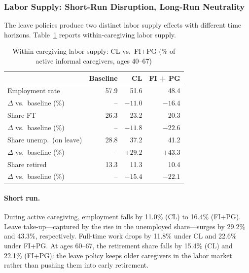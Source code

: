 \subsubsection{Labor Supply: Short-Run Disruption, Long-Run Neutrality}

The leave policies produce two distinct labor supply effects with different time horizons. Table~\ref{tab:main_labor} reports within-caregiving labor supply.

\begin{table}[htbp]
  \centering
  \caption{Within-caregiving labor supply: CL vs.\ FI+PG (\% of active informal caregivers, ages 40--67)}
  \label{tab:main_labor}
  \small
  \begin{tabular}{lrrr}
    \toprule
    & Baseline & CL & FI + PG \\
    \midrule
    Employment rate & 57.9 & 51.6 & 48.4 \\
    $\Delta$ vs.\ baseline (\%) & -- & $-11.0$ & $-16.4$ \\
    Share FT & 26.3 & 23.2 & 20.3 \\
    $\Delta$ vs.\ baseline (\%) & -- & $-11.8$ & $-22.6$ \\
    Share unemp.\ (on leave) & 28.8 & 37.2 & 41.2 \\
    $\Delta$ vs.\ baseline (\%) & -- & $+29.2$ & $+43.3$ \\
    Share retired & 13.3 & 11.3 & 10.4 \\
    $\Delta$ vs.\ baseline (\%) & -- & $-15.4$ & $-22.1$ \\
    \bottomrule
  \end{tabular}
\end{table}

\paragraph{Short run.} During active caregiving, employment falls by 11.0\% (CL) to 16.4\% (FI+PG). Leave take-up---captured by the rise in the unemployed share---surges by 29.2\% and 43.3\%, respectively. Full-time work drops by 11.8\% under CL and 22.6\% under FI+PG. At ages 60--67, the retirement share falls by 15.4\% (CL) and 22.1\% (FI+PG): the leave policy keeps older caregivers in the labor market rather than pushing them into early retirement.

